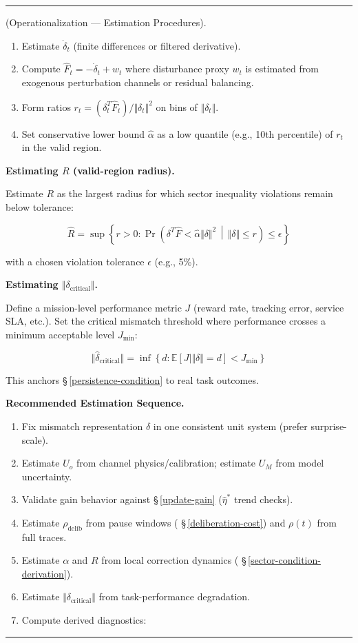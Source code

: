 \documentclass[11pt,oneside]{article}
\newcounter{claim}[section]
\renewcommand{\theclaim}{\thesection.\arabic{claim}}
\newenvironment{segment}[2]{%
  \refstepcounter{claim}%
  \bigskip\noindent\hrule\smallskip
  \noindent{\bfseries #1~\theclaim}\enskip(#2).\par\smallskip
  \noindent\ignorespaces
}{%
  \par\smallskip\noindent\hrule\bigskip
}
\newenvironment{detail}[1][]{\begin{segment}{Detail}{#1}}{\end{segment}}
\begin{document}
\begin{detail}[Operationalization — Estimation Procedures]
\begin{enumerate}
  \item Estimate $\dot{\delta}_t$ (finite differences or filtered derivative).
  \item Compute $\widehat F_t = -\dot{\delta}_t + w_t$ where disturbance proxy $w_t$ is estimated from exogenous perturbation channels or residual balancing.
  \item Form ratios $r_t = (\delta_t^T \widehat F_t) / \Vert\delta_t\Vert^2$ on bins of $\Vert\delta_t\Vert$.
  \item Set conservative lower bound $\hat{\alpha}$ as a low quantile (e.g., 10th percentile) of $r_t$ in the valid region.
\end{enumerate}



\medskip\noindent\textbf{Estimating $R$ (valid-region radius).}


Estimate $R$ as the largest radius for which sector inequality violations remain below tolerance:


$$\hat{R} = \sup \left\{ r > 0 : \Pr\left(\delta^T \widehat{F} < \hat{\alpha}\Vert\delta\Vert^2 \,\middle\vert\, \Vert\delta\Vert \le r\right) \le \epsilon \right\}$$

with a chosen violation tolerance $\epsilon$ (e.g., 5\%).


\medskip\noindent\textbf{Estimating $\Vert\delta_{\text{critical}}\Vert$.}


Define a mission-level performance metric $J$ (reward rate, tracking error, service SLA, etc.). Set the critical mismatch threshold where performance crosses a minimum acceptable level $J_{\min}$:


$$\Vert\hat{\delta}_{\text{critical}}\Vert = \inf \left\{ d : \mathbb{E}[J \mid \Vert\delta\Vert = d] < J_{\min} \right\}$$

This anchors \S\,\ref{persistence-condition} to real task outcomes.


\medskip\noindent\textbf{Recommended Estimation Sequence.}


\begin{enumerate}
  \item Fix mismatch representation $\delta$ in one consistent unit system (prefer surprise-scale).
  \item Estimate $U_o$ from channel physics/calibration; estimate $U_M$ from model uncertainty.
  \item Validate gain behavior against \S\,\ref{update-gain} ($\hat{\eta}^*$ trend checks).
  \item Estimate $\rho_{\text{delib}}$ from pause windows ( \S\,\ref{deliberation-cost}) and $\rho(t)$ from full traces.
  \item Estimate $\alpha$ and $R$ from local correction dynamics ( \S\,\ref{sector-condition-derivation}).
  \item Estimate $\Vert\delta_{\text{critical}}\Vert$ from task-performance degradation.
  \item Compute derived diagnostics:
\end{enumerate}



\end{detail}
\end{document}

